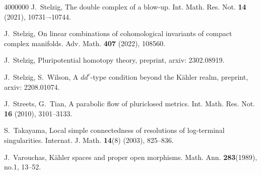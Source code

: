 \documentclass[12pt,reqno]{amsart}
\theoremstyle{definition}
\begin{document}
\begin{thebibliography}{4000000}
 J.~Stelzig, The double complex of a blow-up. Int. Math. Res. Not. {\bf 14} (2021), 10731–-10744.

 J.~Stelzig, On linear combinations of cohomological invariants of compact complex manifolds. Adv. Math. {\bf 407} (2022), 108560.

 J.~Stelzig, Pluripotential homotopy theory, preprint, arxiv: 2302.08919.

J.~Stelzig, S.~Wilson, A $dd^c$-type condition beyond the K\"ahler realm, preprint, arxiv: 2208.01074.

J.~Streets, G.~Tian, A parabolic flow of pluriclosed metrics. Int. Math. Res. Not. {\bf 16} (2010), 3101--3133.

S.~Takayama, Local simple connectedness of resolutions of log-terminal singularities. Internat. J. Math. {\bf 14}(8) (2003), 825--836.

J.~Varouchas, 
K\"ahler spaces and proper open morphisms.
Math. Ann. {\bf 283}(1989), no.1, 13--52.
\end{thebibliography} 
\end{document}
